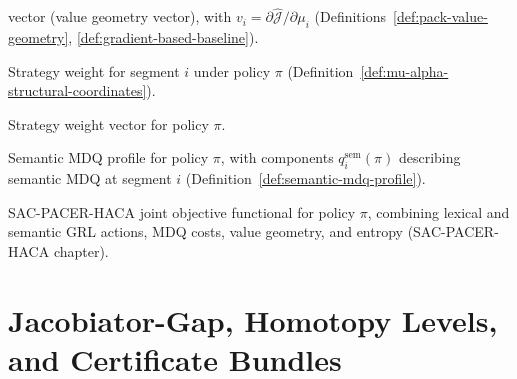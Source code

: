 \documentclass[11pt]{book}
\theoremstyle{plain}
\theoremstyle{definition}
\theoremstyle{remark}
\begin{document}
\begin{description}
        vector (value geometry vector), with
        $v_i=\partial\widehat{\mathcal{J}}/\partial\mu_i$
        (Definitions~\ref{def:pack-value-geometry},
         \ref{def:gradient-based-baseline}).
  \item[$\alpha_i^\pi$] Strategy weight for segment $i$ under policy
        $\pi$ (Definition~\ref{def:mu-alpha-structural-coordinates}).
  \item[$\alpha^\pi=(\alpha_i^\pi)_{i\in I_L}$] Strategy weight vector
        for policy $\pi$.
  \item[$\mathbf{q}^{\mathrm{sem}}(\pi)$] Semantic MDQ profile for
        policy $\pi$, with components
        $q_i^{\mathrm{sem}}(\pi)$ describing semantic MDQ at segment
        $i$ (Definition~\ref{def:semantic-mdq-profile}).
  \item[$\mathcal{J}(\pi)$] SAC-PACER-HACA joint objective functional
        for policy $\pi$, combining lexical and semantic GRL actions,
        MDQ costs, value geometry, and entropy
        (SAC-PACER-HACA chapter).
\end{description}

\section*{Jacobiator-Gap, Homotopy Levels, and Certificate Bundles}
\end{document}
